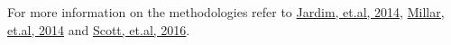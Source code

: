 
For more information on the \aFa methodologies refer to \href{http://icesjms.oxfordjournals.org/content/early/2014/04/03/icesjms.fsu050.abstract}{Jardim, et.al, 2014}, \href{http://icesjms.oxfordjournals.org/content/early/2014/03/31/icesjms.fsu043.abstract}{Millar, et.al, 2014} and \href{http://journals.plos.org/plosone/article?id=10.1371/journal.pone.0154922}{Scott, et.al, 2016}.


